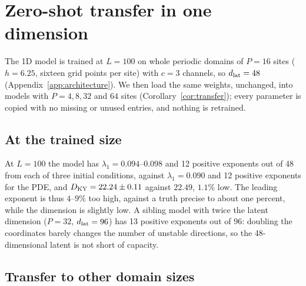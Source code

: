 \section{Zero-shot transfer in one dimension}
\label{sec:results1d}

The 1D model is trained at $L=100$ on whole periodic domains of $P=16$
sites ($h=6.25$, sixteen grid points per site) with $c=3$ channels, so
$d_{\mathrm{lat}}=48$ (Appendix~\ref{app:architecture}). We then load the same
weights, unchanged, into models with $P=4,8,32$ and $64$ sites
(Corollary~\ref{cor:transfer}); every parameter is copied with no missing
or unused entries, and nothing is retrained.

\subsection{At the trained size}

At $L=100$ the model has $\lambda_1=0.094$--$0.098$ and 12 positive
exponents out of 48 from each of three initial conditions, against
$\lambda_1=0.090$ and 12 positive exponents for the PDE, and
$D_{\mathrm{KY}}=22.24\pm0.11$ against $22.49$, $1.1\%$ low. The leading exponent is
thus $4$--$9\%$ too high, against a truth precise to about one percent,
while the dimension is slightly low. A sibling model with
twice the latent dimension ($P=32$, $d_{\mathrm{lat}}=96$) has 13 positive exponents
out of 96: doubling the coordinates barely changes the number of unstable
directions, so the 48-dimensional latent is not short of capacity.

\subsection{Transfer to other domain sizes}

